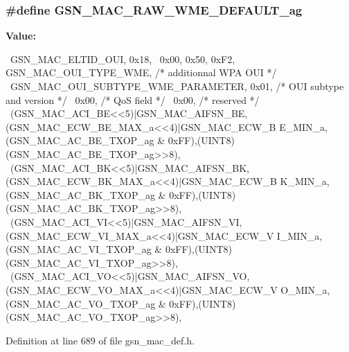 \hypertarget{a00522_a8c69b41f7a9e50fb5a43723a42f5d907}{
\subsubsection[{GSN\_\-MAC\_\-RAW\_\-WME\_\-DEFAULT\_\-ag}]{\setlength{\rightskip}{0pt plus 5cm}\#define GSN\_\-MAC\_\-RAW\_\-WME\_\-DEFAULT\_\-ag}}
\label{a00522_a8c69b41f7a9e50fb5a43723a42f5d907}
{\bfseries Value:}
\begin{DoxyCode}
{{                                                                               
              \
    GSN_MAC_ELTID_OUI, 0x18,                                                     
                  \
    0x00, 0x50, 0xF2, GSN_MAC_OUI_TYPE_WME,         /* additionnal WPA OUI       
               */ \
    GSN_MAC_OUI_SUBTYPE_WME_PARAMETER, 0x01,        /* OUI subtype and version   
               */ \
    0x00,                                       /* QoS field                     
           */ \
    0x00,                                       /* reserved                      
           */ \
    (GSN_MAC_ACI_BE<<5)|GSN_MAC_AIFSN_BE, (GSN_MAC_ECW_BE_MAX_a<<4)|GSN_MAC_ECW_B
      E_MIN_a, (GSN_MAC_AC_BE_TXOP_ag & 0xFF),(UINT8)(GSN_MAC_AC_BE_TXOP_ag>>8), \
    (GSN_MAC_ACI_BK<<5)|GSN_MAC_AIFSN_BK, (GSN_MAC_ECW_BK_MAX_a<<4)|GSN_MAC_ECW_B
      K_MIN_a, (GSN_MAC_AC_BK_TXOP_ag & 0xFF),(UINT8)(GSN_MAC_AC_BK_TXOP_ag>>8), \
    (GSN_MAC_ACI_VI<<5)|GSN_MAC_AIFSN_VI, (GSN_MAC_ECW_VI_MAX_a<<4)|GSN_MAC_ECW_V
      I_MIN_a, (GSN_MAC_AC_VI_TXOP_ag & 0xFF),(UINT8)(GSN_MAC_AC_VI_TXOP_ag>>8), \
    (GSN_MAC_ACI_VO<<5)|GSN_MAC_AIFSN_VO, (GSN_MAC_ECW_VO_MAX_a<<4)|GSN_MAC_ECW_V
      O_MIN_a, (GSN_MAC_AC_VO_TXOP_ag & 0xFF),(UINT8)(GSN_MAC_AC_VO_TXOP_ag>>8), \
}}
\end{DoxyCode}


Definition at line 689 of file gsn\_\-mac\_\-def.h.

